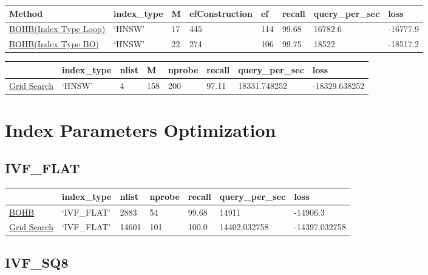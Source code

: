 \begin{longtable}[]{@{}llllllll@{}}
\toprule
Method & index\_type & M & efConstruction & ef & recall &
query\_per\_sec & loss \\
\midrule
\endhead
\href{https://wandb.ai/xiang-pan/HOBO/runs/14pnimgi}{BOHB(Index Type
Loop)} & `HNSW' & 17 & 445 & 114 & 99.68 & 16782.6 & -16777.9 \\
\href{https://wandb.ai/xiang-pan/HOBO/runs/13jdknsy}{BOHB(Index Type
BO)} & `HNSW' & 22 & 274 & 106 & 99.75 & 18522 & -18517.2 \\
\bottomrule
\end{longtable}

\begin{longtable}[]{@{}llllllll@{}}
\toprule
& index\_type & nlist & M & nprobe & recall & query\_per\_sec & loss \\
\midrule
\endhead
\href{https://wandb.ai/xiang-pan/HOBO/runs/3vdvm6gs}{Grid Search} &
`HNSW' & 4 & 158 & 200 & 97.11 & 18331.748252 & -18329.638252 \\
\bottomrule
\end{longtable}

\hypertarget{index-parameters-optimization}{%
\section{Index Parameters
Optimization}\label{index-parameters-optimization}}

\hypertarget{ivf_flat}{%
\subsection{IVF\_FLAT}\label{ivf_flat}}

\begin{longtable}[]{@{}lllllll@{}}
\toprule
& index\_type & nlist & nprobe & recall & query\_per\_sec & loss \\
\midrule
\endhead
\href{https://wandb.ai/xiang-pan/HOBO/runs/9ughlu3l}{BOHB} & `IVF\_FLAT'
& 2883 & 54 & 99.68 & 14911 & -14906.3 \\
\href{https://wandb.ai/xiang-pan/HOBO/runs/22n2lk07}{Grid Search} &
`IVF\_FLAT' & 14601 & 101 & 100.0 & 14402.032758 & -14397.032758 \\
\bottomrule
\end{longtable}

\hypertarget{ivf_sq8}{%
\subsection{IVF\_SQ8}\label{ivf_sq8}}

